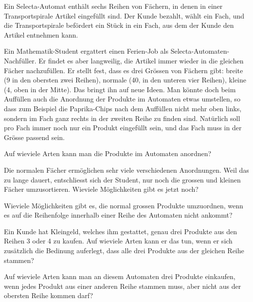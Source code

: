 Ein Selecta-Automat enthält sechs Reihen von Fächern, in denen in einer
Transportspirale Artikel eingefüllt sind. Der Kunde bezahlt, wählt ein
Fach, und die Transportspirale befördert ein Stück in ein Fach, aus dem
der Kunde den Artikel entnehmen kann.
\begin{center}
\end{center}
Ein Mathematik-Student ergattert einen Ferien-Job als
Selecta-Automaten-Nachfüller. Er findet es aber langweilig, die Artikel
immer wieder in die gleichen Fächer nachzufüllen. Er stellt fest,
dass es drei Grössen von Fächern gibt: breite (9 in den obersten zwei Reihen),
normale (40, in den unteren vier Reihen), kleine (4, oben in der Mitte).
Das bringt ihn auf neue Ideen. Man könnte doch beim Auffüllen auch die 
Anordnung der Produkte im Automaten etwas umstellen, so dass zum Beispiel
die Paprika-Chips nach dem Auffüllen nicht mehr oben links, sondern im
Fach ganz rechts in der zweiten Reihe zu finden sind. Natürlich soll
pro Fach immer noch nur ein Produkt eingefüllt sein, und das Fach muss
in der Grösse passend sein.
\begin{teilaufgaben}
\item
Auf wieviele Arten kann man die Produkte im Automaten anordnen?
\item
Die normalen Fächer ermöglichen sehr viele verschiedenen Anordnungen.
Weil das zu lange dauert, entschliesst sich der Student, nur noch die
grossen und kleinen Fächer umzusortieren. Wieviele Möglichkeiten
gibt es jetzt noch?
\item
Wieviele Möglichkeiten gibt es, die normal grossen Produkte
umzuordnen, wenn es auf die Reihenfolge innerhalb einer Reihe des
Automaten nicht ankommt?
\item 
Ein Kunde hat Kleingeld, welches ihm gestattet, genau drei Produkte
aus den Reihen 3 oder 4 zu kaufen. Auf wieviele Arten kann er
das tun, wenn er sich zusätzlich die Bedinung auferlegt, dass alle
drei Produkte aus der gleichen Reihe stammen?
\item
Auf wieviele Arten kann man an diesem Automaten drei Produkte einkaufen, wenn
jedes Produkt aus einer anderen Reihe stammen muss, aber nicht aus
der obersten Reihe kommen darf?
\end{teilaufgaben}

